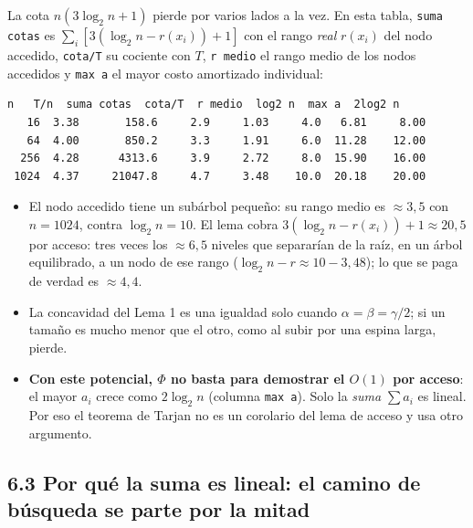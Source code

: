 \documentclass[11pt]{article}
\begin{document}
La cota $n(3\log_2n+1)$ pierde por varios lados a la vez. En esta tabla, \texttt{suma cotas} es $\sum_i[3(\log_2n-r(x_i))+1]$ con el rango \emph{real} $r(x_i)$ del nodo accedido,
\texttt{cota/T} su cociente con $T$, \texttt{r medio} el rango medio de los nodos accedidos y \texttt{max a} el mayor costo amortizado individual:
\begin{lstlisting}[style=salida,basicstyle=\ttfamily\footnotesize\color{black},columns=fixed]
    n   T/n  suma cotas  cota/T  r medio  log2 n  max a  2log2 n
   16  3.38       158.6     2.9     1.03     4.0   6.81     8.00
   64  4.00       850.2     3.3     1.91     6.0  11.28    12.00
  256  4.28      4313.6     3.9     2.72     8.0  15.90    16.00
 1024  4.37     21047.8     4.7     3.48    10.0  20.18    20.00
\end{lstlisting}
\begin{itemize}[leftmargin=14pt,itemsep=2pt]
\item El nodo accedido tiene un subárbol pequeño: su rango medio es $\approx3{,}5$ con $n=1024$, contra $\log_2n=10$. El lema cobra $3(\log_2n-r(x_i))+1\approx20{,}5$ por acceso:
tres veces los $\approx6{,}5$ niveles que separarían de la raíz, en un árbol equilibrado, a un nodo de ese rango ($\log_2n-r\approx10-3{,}48$); lo que se paga de verdad es $\approx4{,}4$.
\item La concavidad del Lema 1 es una igualdad solo cuando $\alpha=\beta=\gamma/2$; si un tamaño es mucho menor que el otro, como al subir por una espina larga, pierde.
\item \textbf{Con este potencial, $\Phi$ no basta para demostrar el $O(1)$ por acceso}: el mayor $a_i$ crece como $2\log_2n$ (columna \texttt{max a}). Solo la \emph{suma} $\sum a_i$ es lineal.
Por eso el teorema de Tarjan no es un corolario del lema de acceso y usa otro argumento.
\end{itemize}

\subsection*{6.3 Por qué la suma es lineal: el camino de búsqueda se parte por la mitad}
\end{document}

